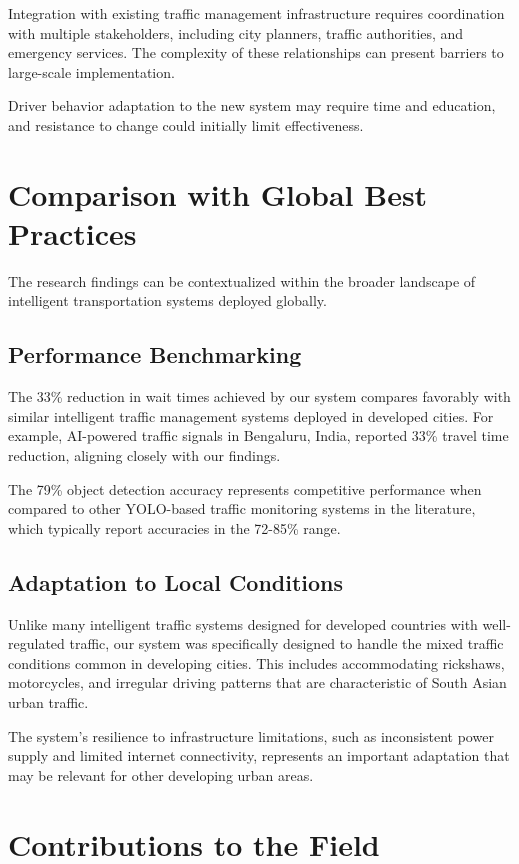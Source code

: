 Integration with existing traffic management infrastructure requires coordination with multiple stakeholders, including city planners, traffic authorities, and emergency services. The complexity of these relationships can present barriers to large-scale implementation.

Driver behavior adaptation to the new system may require time and education, and resistance to change could initially limit effectiveness.

\section{Comparison with Global Best Practices}
\label{sec:global_comparison}

The research findings can be contextualized within the broader landscape of intelligent transportation systems deployed globally.

\subsection{Performance Benchmarking}
The 33\% reduction in wait times achieved by our system compares favorably with similar intelligent traffic management systems deployed in developed cities. For example, AI-powered traffic signals in Bengaluru, India, reported 33\% travel time reduction, aligning closely with our findings.

The 79\% object detection accuracy represents competitive performance when compared to other YOLO-based traffic monitoring systems in the literature, which typically report accuracies in the 72-85\% range.

\subsection{Adaptation to Local Conditions}
Unlike many intelligent traffic systems designed for developed countries with well-regulated traffic, our system was specifically designed to handle the mixed traffic conditions common in developing cities. This includes accommodating rickshaws, motorcycles, and irregular driving patterns that are characteristic of South Asian urban traffic.

The system's resilience to infrastructure limitations, such as inconsistent power supply and limited internet connectivity, represents an important adaptation that may be relevant for other developing urban areas.

\section{Contributions to the Field}
\label{sec:contributions}

